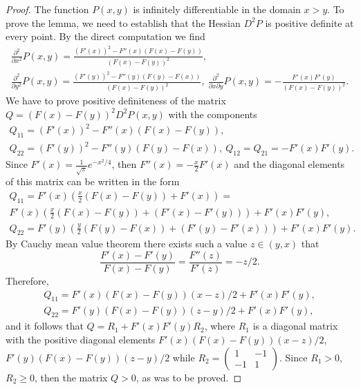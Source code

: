 \documentclass[10pt,a4paper]{amsart}
\numberwithin{equation}{section}
\begin{document}
\begin{proof}
The function $P(x,y)$ is infinitely differentiable in the domain $x>y$. To prove the lemma, we need to establish that the Hessian $D^2 P$ is positive definite at every point. By the direct computation we find
\begin{align*}
\frac{\partial^2}{\partial x^2} P(x,y)=\frac{(F'(x))^2-F''(x)(F(x)-F(y))}{(F(x)-F(y))^2}, \\
\frac{\partial^2}{\partial y^2} P(x,y)=\frac{(F'(y))^2-F''(y)(F(y)-F(x))}{(F(x)-F(y))^2}, \
\frac{\partial^2}{\partial x\partial y} P(x,y)=-\frac{F'(x)F'(y)}{(F(x)-F(y))^2}.
\end{align*}
We have to prove positive definiteness of the matrix $Q=(F(x)-F(y))^2 D^2 P(x,y)$ with the components
\begin{align*}
Q_{11}=(F'(x))^2-F''(x)(F(x)-F(y)), \\ Q_{22}=(F'(y))^2-F''(y)(F(y)-F(x)), \ Q_{12}=Q_{21}=-F'(x)F'(y).
\end{align*}
Since $F'(x)=\frac{1}{\sqrt{\pi}}e^{-x^2/4}$, then $F''(x)=-\frac{x}{2}F'(x)$ and the diagonal elements of this matrix can be written in the form
\begin{align*}
Q_{11}=F'(x)(\frac{x}{2}(F(x)-F(y))+F'(x))= \\ F'(x)(\frac{x}{2}(F(x)-F(y))+(F'(x)-F'(y)))+F'(x)F'(y), \\
Q_{22}=F'(y)(\frac{y}{2}(F(y)-F(x))+(F'(y)-F'(x)))+F'(x)F'(y).
\end{align*}
By Cauchy mean value theorem there exists such a value $z\in (y,x)$ that
\[
\frac{F'(x)-F'(y)}{F(x)-F(y)}=\frac{F''(z)}{F'(z)}=-z/2.
\]
Therefore,
\begin{align*}
Q_{11}=F'(x)(F(x)-F(y))(x-z)/2+F'(x)F'(y), \\ Q_{22}=F'(y)(F(x)-F(y))(z-y)/2+F'(x)F'(y),
\end{align*}
and it follows that $Q=R_1+F'(x)F'(y)R_2$, where $R_1$ is a diagonal matrix with the positive diagonal elements
$F'(x)(F(x)-F(y))(x-z)/2$, $F'(y)(F(x)-F(y))(z-y)/2$ while $R_2=\left(\begin{smallmatrix} 1 & -1 \\ -1 & 1\end{smallmatrix}\right)$. Since $R_1>0$, $R_2\ge 0$, then the matrix $Q>0$, as was to be proved.
\end{proof}
\end{document}
